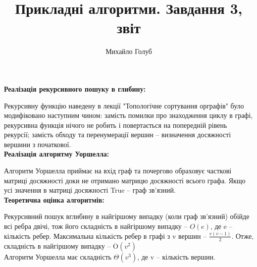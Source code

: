 \documentclass{article}
\title{Прикладні алгоритми. Завдання 3, звіт}
\author{Михайло Голуб}
\begin{document}
\maketitle
\newpage

\textbf{Реалізація рекурсивного пошуку в глибину:}\\\indent

Рекурсивну функцію наведену в лекції "Топологічне сортування орграфів" було модифіковано наступним чином: замість помилки про знаходження циклу в графі, рекурсивна функція нічого не робить і повертається на попередній рівень рекурсії; замість обходу та перенумерації вершин -- визначення досяжності вершини з початкової.\\

\textbf{Реалізація алгоритму Уоршелла:}\\\indent

Алгоритм Уоршелла приймає на вхід граф та почергово обраховує часткові матриці досяжності доки не отримано матрицю досяжності всього графа. Якщо усі значення в матриці досяжності True -- граф зв'язний.\\

\textbf{Теоретична оцінка алгоритмів:}\\\indent

Рекурсивний пошук вглибину в найгіршому випадку (коли граф зв'язний) обійде всі ребра двічі, тож його складність в найгіршому випадку -- $O(e)$, де e -- кількість ребер. Максимальна кількість ребер в графі з v вершин -- $\frac{v(v-1)}{2}$. Отже, складність в найгіршому випадку -- O$(v^2)$\\\indent
Алгоритм Уоршелла має складність $\Theta(v^3)$, де v -- кількість вершин.
\end{document}
